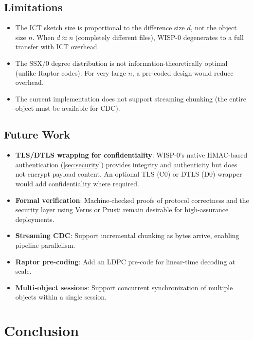 \documentclass[11pt,twocolumn]{article}
\theoremstyle{definition}
\begin{document}
\subsection{Limitations}

\begin{itemize}
  \item The ICT sketch size is proportional to the difference size $d$,
    not the object size $n$. When $d \approx n$ (completely different
    files), WISP-0 degenerates to a full transfer with ICT overhead.
  \item The SSX/0 degree distribution is not information-theoretically
    optimal (unlike Raptor codes). For very large $n$, a pre-coded
    design would reduce overhead.
  \item The current implementation does not support streaming chunking
    (the entire object must be available for CDC).
\end{itemize}

\subsection{Future Work}

\begin{itemize}
  \item \textbf{TLS/DTLS wrapping for confidentiality}: WISP-0's native
    HMAC-based authentication (\cref{sec:security}) provides integrity
    and authenticity but does not encrypt payload content. An optional
    TLS (C0) or DTLS (D0) wrapper would add confidentiality where
    required.
  \item \textbf{Formal verification}: Machine-checked proofs of
    protocol correctness and the security layer using Verus or Prusti
    remain desirable for high-assurance deployments.
  \item \textbf{Streaming CDC}: Support incremental chunking as bytes
    arrive, enabling pipeline parallelism.
  \item \textbf{Raptor pre-coding}: Add an LDPC pre-code for
    linear-time decoding at scale.
  \item \textbf{Multi-object sessions}: Support concurrent
    synchronization of multiple objects within a single session.
\end{itemize}


\section{Conclusion}
\label{sec:conclusion}
\end{document}
